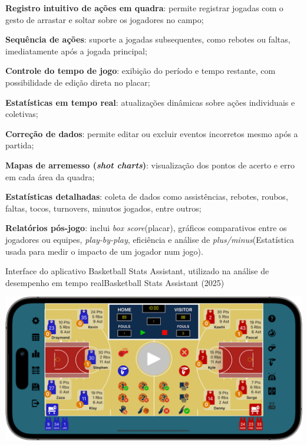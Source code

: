\begin{myitemize}
    \item \textbf{Registro intuitivo de ações em quadra}: permite registrar jogadas com o gesto de arrastar e soltar sobre os jogadores no campo;
    \item \textbf{Sequência de ações}: suporte a jogadas subsequentes, como rebotes ou faltas, imediatamente após a jogada principal;
    \item \textbf{Controle do tempo de jogo}: exibição do período e tempo restante, com possibilidade de edição direta no placar;
    \item \textbf{Estatísticas em tempo real}: atualizações dinâmicas sobre ações individuais e coletivas;
    \item \textbf{Correção de dados}: permite editar ou excluir eventos incorretos mesmo após a partida;
    \item \textbf{Mapas de arremesso (\textit{shot charts})}: visualização dos pontos de acerto e erro em cada área da quadra;
    \item \textbf{Estatísticas detalhadas}: coleta de dados como assistências, rebotes, roubos, faltas, tocos, turnovers, minutos jogados, entre outros;
    \item \textbf{Relatórios pós-jogo}: inclui \textit{box score}(placar), gráficos comparativos entre os jogadores ou equipes, \textit{play-by-play}, eficiência e análise de \textit{plus/minus}(Estatística usada para medir o impacto de um jogador num jogo).
\end{myitemize}


\begin{figura}{Interface do aplicativo Basketball Stats Assistant, utilizado na análise de desempenho em tempo real}{Basketball Stats Assistant (2025)}
    \begin{flushleft}
        \label{fig:app-desempenho}
        \includegraphics[width=0.7\linewidth]{resources/floats/ilustracoes/desempenho.png}
    \end{flushleft}
\end{figura}
\FloatBarrier

